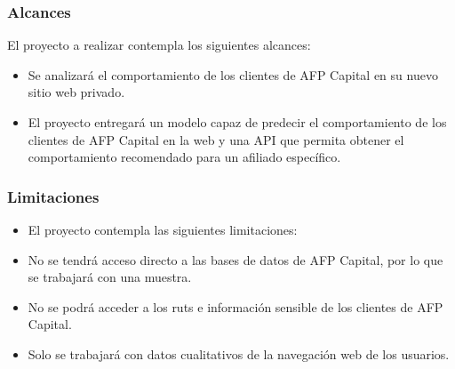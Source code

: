 \subsubsection{Alcances}

El proyecto a realizar contempla los siguientes alcances: 

\begin{itemize}
    \item Se analizará el comportamiento de los clientes de AFP Capital en su nuevo sitio web privado.
    \item El proyecto entregará un modelo capaz de predecir el comportamiento de los clientes de AFP Capital en la web y una API que permita obtener el comportamiento recomendado para un afiliado específico.
\end{itemize}


\subsubsection{Limitaciones }

\begin{itemize}
    \item El proyecto contempla las siguientes limitaciones:
    \item No se tendrá acceso directo a las bases de datos de AFP Capital, por lo que se trabajará con una muestra.
    \item No se podrá acceder a los ruts e información sensible de los clientes de AFP Capital.
    \item Solo se trabajará con datos cualitativos de la navegación web de los usuarios.
\end{itemize}
